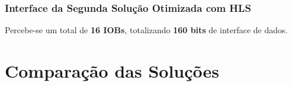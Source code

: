 \documentclass{beamer}
\begin{document}
    \begin{frame}
        \frametitle{Interface da Segunda Solução Otimizada com HLS}

        \begingroup {}
        Percebe-se um total de \textbf{16 IOBs}, totalizando
        \textbf{160 bits} de interface de dados.
        \endgroup

        \begin{figure}[h] 
            \centering
          \end{figure}
    \end{frame}

    \section{Comparação das Soluções}
\end{document}
